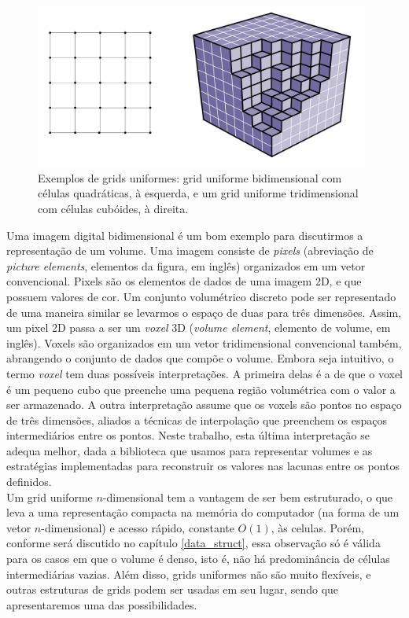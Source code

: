 \documentclass[12pt, a4paper, oneside]{book}
\begin{document}
\begin{figure}[!htb]
\center
\includegraphics[width=11cm]{grid_example}
\caption{Exemplos de grids uniformes: grid uniforme bidimensional com células quadráticas, à esquerda, e um grid uniforme tridimensional com células cubóides, à direita.}
\label{grid_ex}
\end{figure}

Uma imagem digital bidimensional é um bom exemplo para discutirmos a representação de um volume. Uma imagem consiste de {\it pixels} (abreviação de {\it picture elements}, elementos da figura, em inglês) organizados em um vetor convencional. Pixels são os elementos de dados de uma imagem 2D, e que possuem valores de cor.
Um conjunto volumétrico discreto pode ser representado de uma maneira similar se levarmos o espaço de duas para três dimensões. Assim, um pixel 2D passa a ser um {\it voxel} 3D ({\it volume element}, elemento de volume, em inglês). Voxels são organizados em um vetor tridimensional convencional também, abrangendo o conjunto de dados que compõe o volume.
Embora seja intuitivo, o termo {\it voxel} tem duas possíveis interpretações. A primeira delas é a de que o voxel é um pequeno cubo que preenche uma pequena região volumétrica com o valor a ser armazenado. A outra interpretação assume que os voxels são pontos no espaço de três dimensões, aliados a técnicas de interpolação que preenchem os espaços intermediários entre os pontos. Neste trabalho, esta última interpretação se adequa melhor, dada a biblioteca que usamos para representar volumes e as estratégias implementadas para reconstruir os valores nas lacunas entre os pontos definidos. \\

Um grid uniforme $n$-dimensional tem a vantagem de ser bem estruturado, o que leva a uma representação compacta na memória do computador (na forma de um vetor $n$-dimensional) e acesso rápido, constante $O(1)$, às celulas. Porém, conforme será discutido no capítulo \ref{data_struct}, essa observação só é válida para os casos em que o volume é denso, isto é, não há predominância de células intermediárias vazias. Além disso, grids uniformes não são muito flexíveis, e outras estruturas de grids podem ser usadas em seu lugar, sendo que apresentaremos uma das possibilidades. \\
\end{document}
